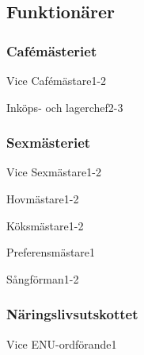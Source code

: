 \documentclass[10pt]{article}
\begin{document}
\newpage

\subsection{Funktionärer}
\subsubsection{Cafémästeriet}
\begin{vallista}
    \begin{post}{Vice Cafémästare}{1-2}
    \end{post}
    \begin{post}{Inköps- och lagerchef}{2-3}
    \end{post}
\end{vallista}

\subsubsection{Sexmästeriet}
\begin{vallista}
    \begin{post}{Vice Sexmästare}{1-2}
    \end{post}
    \begin{post}{Hovmästare}{1-2}
    \end{post}
    \begin{post}{Köksmästare}{1-2}
    \end{post}
    \begin{post}{Preferensmästare}{1}
    \end{post}
    \begin{post}{Sångförman}{1-2}
    \end{post}
\end{vallista}

\subsubsection{Näringslivsutskottet}
\begin{vallista}
    \begin{post}{Vice ENU-ordförande}{1}

    \end{post}
\end{vallista}
\end{document}
